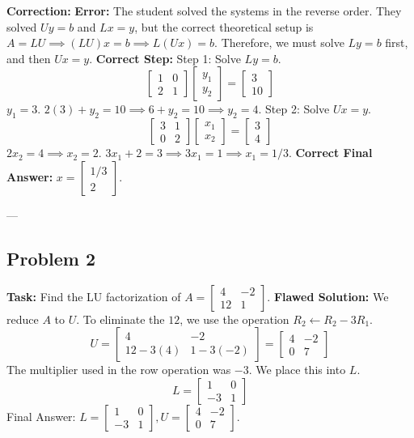 \documentclass[11pt]{article}
\begin{document}
\vspace{1cm}
\textbf{Correction:}
\textbf{Error:} The student solved the systems in the reverse order. They solved $Uy = b$ and $Lx = y$, but the correct theoretical setup is $A = LU \implies (LU)x = b \implies L(Ux) = b$. Therefore, we must solve $Ly = b$ first, and then $Ux = y$.
\textbf{Correct Step:}
Step 1: Solve $Ly = b$.
\[ \begin{bmatrix} 1 & 0 \\ 2 & 1 \end{bmatrix} \begin{bmatrix} y_1 \\ y_2 \end{bmatrix} = \begin{bmatrix} 3 \\ 10 \end{bmatrix} \]
$y_1 = 3$.
$2(3) + y_2 = 10 \implies 6 + y_2 = 10 \implies y_2 = 4$.
Step 2: Solve $Ux = y$.
\[ \begin{bmatrix} 3 & 1 \\ 0 & 2 \end{bmatrix} \begin{bmatrix} x_1 \\ x_2 \end{bmatrix} = \begin{bmatrix} 3 \\ 4 \end{bmatrix} \]
$2x_2 = 4 \implies x_2 = 2$.
$3x_1 + 2 = 3 \implies 3x_1 = 1 \implies x_1 = 1/3$.
\textbf{Correct Final Answer:} $x = \begin{bmatrix} 1/3 \\ 2 \end{bmatrix}$.

---

\subsection{Problem 2}
\textbf{Task:} Find the LU factorization of $A = \begin{bmatrix} 4 & -2 \\ 12 & 1 \end{bmatrix}$.
\textbf{Flawed Solution:}
We reduce $A$ to $U$.
To eliminate the $12$, we use the operation $R_2 \leftarrow R_2 - 3R_1$.
\[ U = \begin{bmatrix} 4 & -2 \\ 12 - 3(4) & 1 - 3(-2) \end{bmatrix} = \begin{bmatrix} 4 & -2 \\ 0 & 7 \end{bmatrix} \]
The multiplier used in the row operation was $-3$. We place this into $L$.
\[ L = \begin{bmatrix} 1 & 0 \\ -3 & 1 \end{bmatrix} \]
Final Answer: $L = \begin{bmatrix} 1 & 0 \\ -3 & 1 \end{bmatrix}, U = \begin{bmatrix} 4 & -2 \\ 0 & 7 \end{bmatrix}$.
\end{document}
